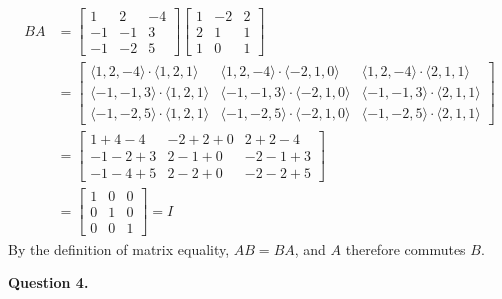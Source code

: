 \documentclass[11pt]{article}
\begin{document}
\begin{enumerate}[label=\alph*)]
\[
\begin{aligned}
BA &= 
\begin{bmatrix}
1 & 2 & -4 \\
-1 & -1 & 3 \\
-1 & -2 & 5
\end{bmatrix}
\begin{bmatrix}
1 & -2 & 2 \\
2 & 1 & 1 \\
1 & 0 & 1
\end{bmatrix} \\[1em]
&=
\begin{bmatrix}
\langle 1, 2, -4 \rangle \cdot \langle 1, 2, 1 \rangle & \langle 1, 2, -4 \rangle \cdot \langle -2, 1, 0 \rangle & \langle 1, 2, -4 \rangle \cdot \langle 2, 1, 1 \rangle \\
\langle -1, -1, 3 \rangle \cdot \langle 1, 2, 1 \rangle & \langle -1, -1, 3 \rangle \cdot \langle -2, 1, 0 \rangle & \langle -1, -1, 3 \rangle \cdot \langle 2, 1, 1 \rangle \\
\langle -1, -2, 5 \rangle \cdot \langle 1, 2, 1 \rangle & \langle -1, -2, 5 \rangle \cdot \langle -2, 1, 0 \rangle & \langle -1, -2, 5 \rangle \cdot \langle 2, 1, 1 \rangle
\end{bmatrix} \\[1em]
&=
\begin{bmatrix}
1 + 4 - 4 & -2 + 2 + 0 & 2 + 2 - 4 \\
-1 - 2 + 3 & 2 - 1 + 0 & -2 - 1 + 3 \\
-1 - 4 + 5 & 2 - 2 + 0 & -2 - 2 + 5
\end{bmatrix} \\[1em]
&=
\begin{bmatrix}
1 & 0 & 0 \\
0 & 1 & 0 \\
0 & 0 & 1
\end{bmatrix} = I
\end{aligned}
\]
By the definition of matrix equality, \(AB = BA\), and \(A\) therefore commutes \(B\).

\end{enumerate}
\color{black}

\textbf{Question 4.}
\end{document}
